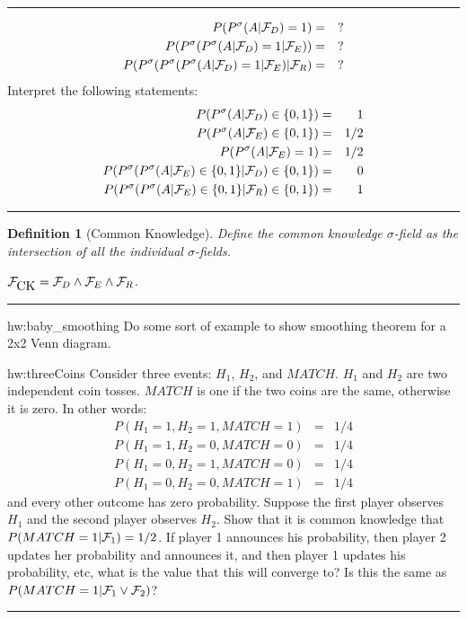 \documentclass[14pt]{extarticle}
\newtheorem{definition}{Definition}
\newenvironment{textHW}{
  \noindent\rule{\textwidth}{1pt}%
  \begin{list}{}{
      \setlength{\labelwidth}{1cm}
      \setlength{\labelsep}{0.3cm}
      \setlength{\leftmargin}{1.3cm}
      \setlength{\rightmargin}{1cm}
      \setlength{\parsep}{0.5ex plus0.2ex minus0.1ex}
      \setlength{\topsep}{1pt plus3pt minus1pt}
      \setlength{\itemsep}{0ex plus0.2ex} 
      \renewcommand{\makelabel}[1]{\label{thw:##1}{\ref{##1}}}
      \sl}}%
  {\end{list}\rule{\textwidth}{1pt}}
\newcommand{\notes}{}
\begin{document}
\begin{textHW}
\begin{enumerate}
\begin{eqnarray*}
    P(P^\sigma(A|{\cal  F}_D) = 1) & = & ? \\
    P(P^\sigma(P^\sigma(A|{\cal  F}_D) = 1|{\cal F}_E)) & = & ? \\
    P(P^\sigma(P^\sigma(P^\sigma(A|{\cal  F}_D) = 1|{\cal
      F}_E)|{\cal F}_R) & = & ? 
  \end{eqnarray*}
  Interpret the following statements:
  \begin{eqnarray*}
    P(P^\sigma(A|{\cal F}_D) \in \{0,1\}) & = & 1 \\
    P(P^\sigma(A|{\cal F}_E) \in \{0,1\}) & = & 1/2 \\
    P(P^\sigma(A|{\cal F}_E) = 1) & = & 1/2 \\
    P(P^\sigma(P^\sigma(A|{\cal F}_E) \in \{0,1\}|{\cal F}_D) \in
    \{0,1\}) & = & 0 \\ 
    P(P^\sigma(P^\sigma(A|{\cal F}_E) \in \{0,1\}|{\cal F}_R) \in
    \{0,1\}) & = & 1 
  \end{eqnarray*}
\end{enumerate}
\end{textHW}

\begin{definition}[Common Knowledge] \label{def:common_knowledge}
  Define the common knowledge $\sigma$-field as the intersection of all
  the individual $\sigma$-fields.  
\end{definition}

${\cal F}_{\hbox{CK}}= {\cal F}_D \wedge {\cal F}_E \wedge {\cal F}_R$.


\begin{textHW}
\item[hw:baby_smoothing] {\notes Do some sort of example to show
    smoothing theorem for a 2x2 Venn diagram.}
\item[hw:threeCoins] Consider three events: $H_1$, $H_2$, and $MATCH$.
  $H_1$ and $H_2$ are two independent coin tosses.  $MATCH$ is one if
  the two coins are the same, otherwise it is zero.  In other words:
  \begin{eqnarray*}
    P(H_1=1,H_2=1,MATCH=1) & = & 1/4 \\
    P(H_1=1,H_2=0,MATCH=0) & = & 1/4 \\
    P(H_1=0,H_2=1,MATCH=0) & = & 1/4 \\
    P(H_1=0,H_2=0,MATCH=1) & = & 1/4 
  \end{eqnarray*}
  and every other outcome has zero probability.  Suppose the first
  player observes $H_1$ and the second player observes $H_2$.  Show that it
  is common knowledge that $P(MATCH=1|{\cal F}_1) = 1/2$.  If player 1
  announces his probability, then player 2 updates her probability and
  announces it, and then player 1 updates his probability, etc, what
  is the value that this will converge to?  Is this the same as
  $P(MATCH=1|{\cal F}_1 \vee {\cal F}_2)$?
\end{textHW}
 
\end{document}
